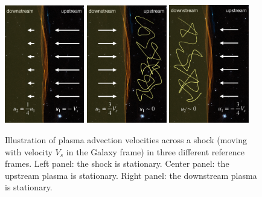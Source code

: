 \begin{figure}[t]
\centering
\includegraphics[width=0.31\textwidth]{figures/shockframe0.pdf} 
\includegraphics[width=0.31\textwidth]{figures/shockframe1.pdf} 
\includegraphics[width=0.31\textwidth]{figures/shockframe2.pdf} 
\caption{Illustration of plasma advection velocities across a shock (moving with velocity \( V_s \) in the Galaxy frame) in three different reference frames. Left panel: the shock is stationary. Center panel: the upstream plasma is stationary. Right panel: the downstream plasma is stationary.}\label{fig:shockframe}
\end{figure}

